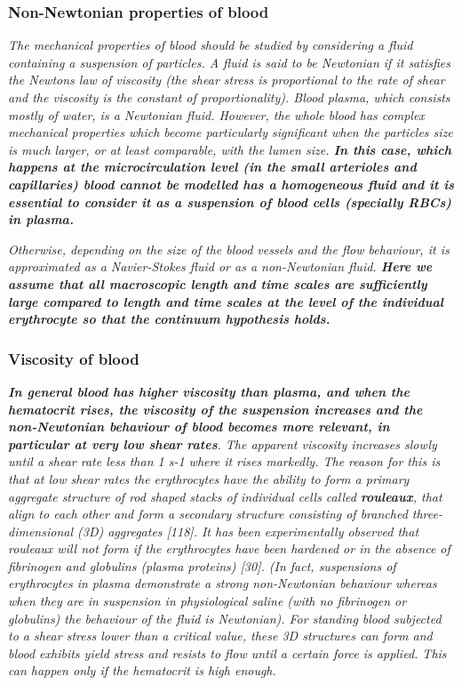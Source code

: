 \documentclass[11pt,letterpaper]{article}
\begin{document}
\subsubsection*{Non-Newtonian properties of blood} \textit{The mechanical properties of blood should be studied by considering a fluid containing a suspension of particles. A fluid is said to be Newtonian if it satisfies the Newtons law of viscosity (the shear stress is proportional to the rate of shear and the viscosity is the constant of proportionality). Blood plasma, which consists mostly of water, is a Newtonian fluid. However, the whole blood has complex mechanical properties which become particularly significant when the particles size is much larger, or at least comparable, with the lumen size. \textbf{In this case, which happens at the microcirculation level (in the small arterioles and capillaries) blood cannot be modelled has a homogeneous fluid and it is essential to consider it as a suspension of blood cells (specially RBCs) in plasma.}}

\textit{Otherwise, depending on the size of the blood vessels and the flow behaviour, it is approximated as a
Navier-Stokes fluid or as a non-Newtonian fluid.{\color{blue}\textbf{ Here we assume that all macroscopic length and time scales are sufficiently large compared to length and time scales at the level of the individual erythrocyte so that the continuum hypothesis holds.}} }

\subsubsection*{Viscosity of blood}
\textit{\textbf{In general blood has higher viscosity than plasma, and when the hematocrit rises, the viscosity of the suspension increases and the non-Newtonian behaviour of blood becomes more relevant, in particular at {\color{blue}very low shear rates}}. The apparent viscosity increases slowly until a shear rate less than 1 s-1
where it rises markedly. The reason for this is that at low shear rates the erythrocytes have the ability to form a primary aggregate structure of rod shaped stacks of individual cells called \textbf{rouleaux}, that align to each other and form a secondary structure consisting of branched three-dimensional (3D) aggregates [118]. It has been experimentally observed that rouleaux will not form if the erythrocytes have been hardened or in the absence of fibrinogen and globulins (plasma proteins) [30]. (In fact, suspensions of erythrocytes in plasma demonstrate a strong non-Newtonian behaviour whereas when they are in suspension in physiological saline (with no fibrinogen or globulins) the behaviour of the fluid is Newtonian). For standing blood subjected to a shear stress lower than a critical value, these 3D structures can form and blood exhibits yield stress and resists to flow until a certain force is applied. This can happen only if the hematocrit is high enough.}
\end{document}
